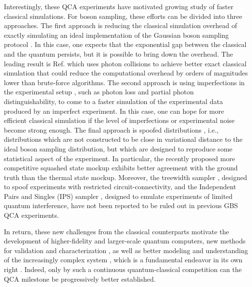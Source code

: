 \documentclass[aps,prl,groupedaddress,superscriptaddress,showpacs,reprint,nofootinbib,nolongbibliography]{revtex4-2}
\begin{document}
Interestingly, these QCA experiments have motivated growing study of faster classical simulations. For boson sampling, these efforts can be divided into three approaches.
The first approach is reducing the classical simulation overhead of exactly simulating an ideal implementation of the Gaussian boson sampling protocol \cite{kaposiPolynomialSpeedupTorontonian2021, 
quesadaQuadraticSpeedUpSimulating2022,
bulmerBoundaryQuantumAdvantage2022}. In this case, one expects that the exponential gap between the classical and the quantum persists, but it is possible to bring down the overhead. The leading result is Ref. \cite{bulmerBoundaryQuantumAdvantage2022} which uses photon collisions to achieve better exact classical simulation that could reduce the computational overhead by orders of magnitudes lower than brute-force algorithms.
The second approach is using imperfections in the experimental setup \cite{qiRegimesClassicalSimulability2020,
renemaSimulabilityPartiallyDistinguishable2020,shiEffectPartialDistinguishability2022}, such as photon loss and partial photon distinguishability, to come to a faster simulation of the experimental data produced by an imperfect experiment. In this case, one can hope for more efficient classical simulation if the level of imperfections or experimental noise become strong enough. The final approach is spoofed distributions \cite{bulmerBoundaryQuantumAdvantage2022,villalongaEfficientApproximationExperimental2022, ohClassicalSimulationBoson2022, ohSpoofingCrossEntropy2022}, i.e., distributions which are not constructed to be close in variational distance to the ideal boson sampling distribution, but which are designed to reproduce some statistical aspect of the experiment. In particular, the recently proposed more competitive squashed state mockup \cite{madsenQuantumComputationalAdvantage2022} exhibits better agreement with the ground truth than the thermal state mockup. Moreover, the treewidth sampler \cite{ohClassicalSimulationBoson2022}, designed to spoof experiments with restricted circuit-connectivity, and the Independent Pairs and Singles (IPS) sampler \cite{bulmerBoundaryQuantumAdvantage2022}, designed to emulate experiments of limited quantum interference, have not been reported to be ruled out in previous GBS QCA experiments.

In return, these new challenges from the classical counterparts motivate the development of higher-fidelity and larger-scale quantum computers, new methods for validation and characterization \cite{shchesnovich2021distinguishing,
delliosValidationTestsGBS2022,
seron2022efficient,
giordaniCertificationGaussianBoson2023}, as well as better modeling and understanding of the increasingly complex system \cite{
drummondSimulatingComplexNetworks2021,popovaCrackingQuantumAdvantage2021,
grierComplexityBipartiteGaussian2022,
limApproximatingOutcomeProbabilities2022, delliosSimulatingMacroscopicQuantum2022,
iosue2022page,
qiao2022entanglement,
liuComplexityGaussianBoson2023, ohClassicalSimulationAlgorithms2023}, which is a fundamental endeavor in its own right \cite{rahimi-keshariSufficientConditionsEfficient2016, deshpandeDynamicalPhaseTransitions2018,chabaud2023resources}. Indeed, only by such a continuous quantum-classical competition can the QCA milestone be progressively better established.
\end{document}
